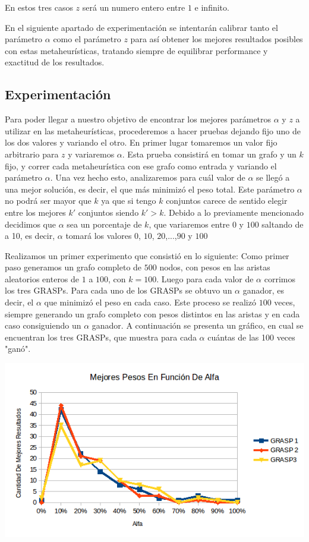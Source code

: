 En estos tres casos $z$ será un numero entero entre $1$ e infinito.

En el siguiente apartado de experimentación se intentarán calibrar tanto el parámetro $\alpha$ como el parámetro $z$ para así obtener los mejores resultados posibles con estas metaheurísticas, tratando siempre de equilibrar performance y exactitud de los resultados.

\subsection{Experimentación}

Para poder llegar a nuestro objetivo de encontrar los mejores parámetros $\alpha$ y $z$ a utilizar en las metaheurísticas, procederemos a hacer pruebas dejando fijo uno de los dos valores y variando el otro.
En primer lugar tomaremos un valor fijo arbitrario para $z$ y variaremos $\alpha$. Esta prueba consistirá en tomar un grafo y un $k$ fijo, y correr cada metaheurística con ese grafo como entrada y variando el parámetro $\alpha$. Una vez hecho esto, analizaremos para cuál valor de $\alpha$ se llegó a una mejor solución, es decir, el que más minimizó el peso total. Este parámetro $\alpha$ no podrá ser mayor que $k$ ya que si tengo $k$ conjuntos carece de sentido elegir entre los mejores $k'$ conjuntos siendo $k'>k$. Debido a lo previamente mencionado decidimos que $\alpha$ sea un porcentaje de $k$, que variaremos entre $0$ y $100$ saltando de a 10, es decir, $\alpha$ tomará los valores $0$, $10$, $20$,...,$90$ y $100$ 

Realizamos un primer experimento que consistió en lo siguiente:
Como primer paso generamos un grafo completo de $500$ nodos, con pesos en las aristas aleatorios enteros de $1$ a $100$, con $k=100$. Luego para cada valor de $\alpha$ corrimos los tres GRASPs. Para cada uno de los GRASPs se obtuvo un $\alpha$ ganador, es decir, el $\alpha$ que minimizó el peso en cada caso. Este proceso se realizó $100$ veces, siempre generando un grafo completo con pesos distintos en las aristas y en cada caso consiguiendo un $\alpha$ ganador. A continuación se presenta un gráfico, en cual se encuentran los tres GRASPs, que muestra para cada $\alpha$ cuántas de las 100 veces "ganó". 

\includegraphics[scale=0.7]{Ej5/respuestasAlfa1.png}\\

